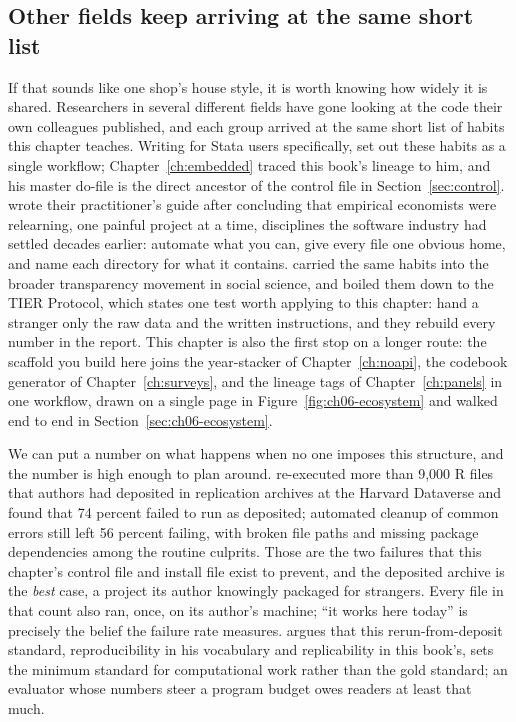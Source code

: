 \documentclass[
    a4paper,
    fontsize=10pt,
    twoside=true,
    numbers=noenddot,
]{kaobook}
\begin{document}
\subsection{Other fields keep arriving at the same short list}\label{sec:ch02-evidence}
If that sounds like one shop's house style, it is worth knowing how widely it is shared. Researchers in several different fields have gone looking at the code their own colleagues published, and each group arrived at the same short list of habits this chapter teaches. Writing for Stata users specifically, \textcite{long2009workflow} set out these habits as a single workflow; Chapter~\ref{ch:embedded} traced this book's lineage to him, and his master do-file is the direct ancestor of the control file in Section~\ref{sec:control}. \textcite{gentzkow2014code} wrote their practitioner's guide after concluding that empirical economists were relearning, one painful project at a time, disciplines the software industry had settled decades earlier: automate what you can, give every file one obvious home, and name each directory for what it contains. \textcite{christensen2019transparent} carried the same habits into the broader transparency movement in social science, and \textcite{ball2012tier} boiled them down to the TIER Protocol, which states one test worth applying to this chapter: hand a stranger only the raw data and the written instructions, and they rebuild every number in the report. This chapter is also the first stop on a longer route: the scaffold you build here joins the year-stacker of Chapter~\ref{ch:noapi}, the codebook generator of Chapter~\ref{ch:surveys}, and the lineage tags of Chapter~\ref{ch:panels} in one workflow, drawn on a single page in Figure~\ref{fig:ch06-ecosystem} and walked end to end in Section~\ref{sec:ch06-ecosystem}.

We can put a number on what happens when no one imposes this structure, and the number is high enough to plan around. \textcite{trisovic2022code} re-executed more than 9{,}000 R files that authors had deposited in replication archives at the Harvard Dataverse and found that 74 percent failed to run as deposited; automated cleanup of common errors still left 56 percent failing, with broken file paths and missing package dependencies among the routine culprits. Those are the two failures that this chapter's control file and install file exist to prevent, and the deposited archive is the \emph{best} case, a project its author knowingly packaged for strangers. Every file in that count also ran, once, on its author's machine; \enquote{it works here today} is precisely the belief the failure rate measures. \textcite{peng2011reproducible} argues that this rerun-from-deposit standard, reproducibility in his vocabulary and replicability in this book's, sets the minimum standard for computational work rather than the gold standard; an evaluator whose numbers steer a program budget owes readers at least that much.
\end{document}
